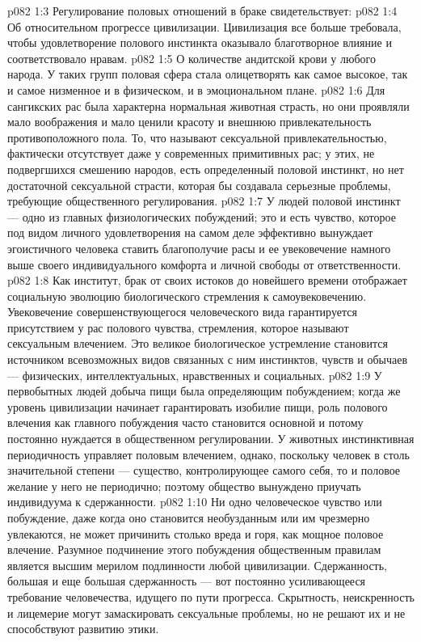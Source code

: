 \vs p082 1:3 \pc Регулирование половых отношений в браке свидетельствует:
\vs p082 1:4 \bibnobreakspace Об относительном прогрессе цивилизации. Цивилизация все больше требовала, чтобы удовлетворение полового инстинкта оказывало благотворное влияние и соответствовало нравам.
\vs p082 1:5 \pc {}\bibnobreakspace О количестве андитской крови у любого народа. У таких групп половая сфера стала олицетворять как самое высокое, так и самое низменное и в физическом, и в эмоциональном плане.
\vs p082 1:6 \pc Для сангикских рас была характерна нормальная животная страсть, но они проявляли мало воображения и мало ценили красоту и внешнюю привлекательность противоположного пола. То, что называют сексуальной привлекательностью, фактически отсутствует даже у современных примитивных рас; у этих, не подвергшихся смешению народов, есть определенный половой инстинкт, но нет достаточной сексуальной страсти, которая бы создавала серьезные проблемы, требующие общественного регулирования.
\vs p082 1:7 У людей половой инстинкт --- одно из главных физиологических побуждений; это и есть чувство, которое под видом личного удовлетворения на самом деле эффективно вынуждает эгоистичного человека ставить благополучие расы и ее увековечение намного выше своего индивидуального комфорта и личной свободы от ответственности.
\vs p082 1:8 Как институт, брак от своих истоков до новейшего времени отображает социальную эволюцию биологического стремления к самоувековечению. Увековечение совершенствующегося человеческого вида гарантируется присутствием у рас полового чувства, стремления, которое называют сексуальным влечением. Это великое биологическое устремление становится источником всевозможных видов связанных с ним инстинктов, чувств и обычаев --- физических, интеллектуальных, нравственных и социальных.
\vs p082 1:9 У первобытных людей добыча пищи была определяющим побуждением; когда же уровень цивилизации начинает гарантировать изобилие пищи, роль полового влечения как главного побуждения часто становится основной и потому постоянно нуждается в общественном регулировании. У животных инстинктивная периодичность управляет половым влечением, однако, поскольку человек в столь значительной степени --- существо, контролирующее самого себя, то и половое желание у него не периодично; поэтому общество вынуждено приучать индивидуума к сдержанности.
\vs p082 1:10 Ни одно человеческое чувство или побуждение, даже когда оно становится необузданным или им чрезмерно увлекаются, не может причинить столько вреда и горя, как мощное половое влечение. Разумное подчинение этого побуждения общественным правилам является высшим мерилом подлинности любой цивилизации. Сдержанность, большая и еще большая сдержанность --- вот постоянно усиливающееся требование человечества, идущего по пути прогресса. Скрытность, неискренность и лицемерие могут замаскировать сексуальные проблемы, но не решают их и не способствуют развитию этики.
